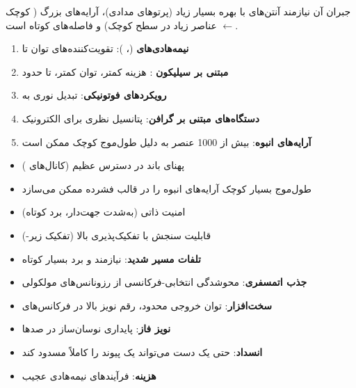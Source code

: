 جبران آن نیازمند آنتن‌های با بهره بسیار زیاد (پرتوهای مدادی)، آرایه‌های بزرگ (\lr{$\lambda$} کوچک \ensuremath{\leftarrow} عناصر زیاد در سطح کوچک) و فاصله‌های کوتاه است.


\begin{enumerate}
\def\labelenumi{\arabic{enumi}.}
\tightlist
\item
  \textbf{نیمه‌هادی‌های } (، ): تقویت‌کننده‌های توان تا 
\item
  \textbf{مبتنی بر سیلیکون }: هزینه کمتر، توان کمتر، تا حدود 
\item
  \textbf{رویکردهای فوتونیکی}: تبدیل نوری به 
\item
  \textbf{دستگاه‌های مبتنی بر گرافن}: پتانسیل نظری برای الکترونیک 
\item
  \textbf{آرایه‌های انبوه}: بیش از 1000 عنصر به دلیل طول‌موج کوچک ممکن است
\end{enumerate}


\begin{itemize}
\tightlist
\item
  پهنای باند در دسترس عظیم (کانال‌های )
\item
  طول‌موج بسیار کوچک آرایه‌های انبوه را در قالب فشرده ممکن می‌سازد
\item
  امنیت ذاتی (به‌شدت جهت‌دار، برد کوتاه)
\item
  قابلیت سنجش با تفکیک‌پذیری بالا (تفکیک زیر-)
\end{itemize}


\begin{itemize}
\tightlist
\item
  \textbf{تلفات مسیر شدید}: نیازمند  و برد بسیار کوتاه
\item
  \textbf{جذب اتمسفری}: محوشدگی انتخابی-فرکانسی از رزونانس‌های مولکولی
\item
  \textbf{سخت‌افزار}: توان خروجی محدود، رقم نویز بالا در فرکانس‌های 
\item
  \textbf{نویز فاز}: پایداری نوسان‌ساز در صدها 
\item
  \textbf{انسداد}: حتی یک دست می‌تواند یک پیوند  را کاملاً مسدود کند
\item
  \textbf{هزینه}: فرآیندهای نیمه‌هادی عجیب
\end{itemize}

